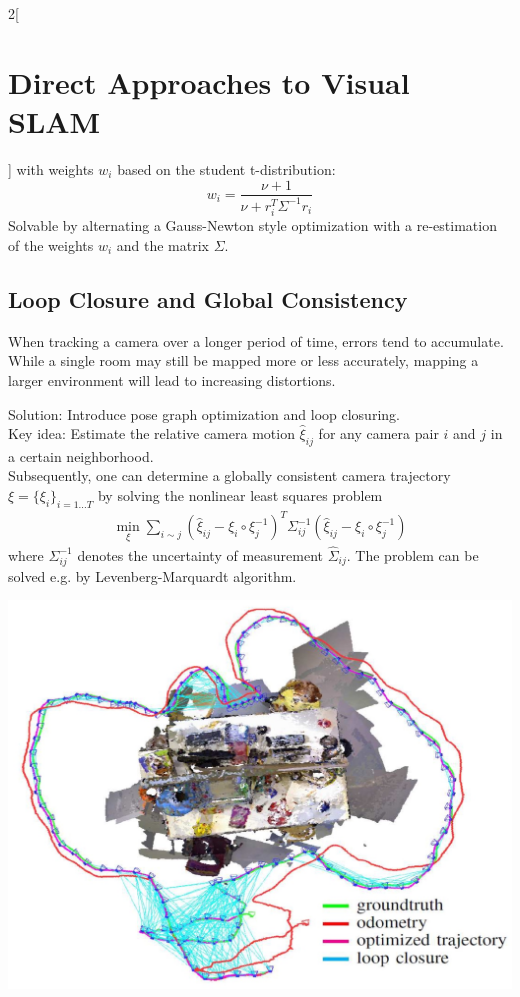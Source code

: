 \documentclass[oneside,fontsize=11pt,paper=a4]{scrartcl}
\newenvironment{myfigure}
  {\par\medskip\noindent\minipage{\linewidth}}
  {\endminipage\par\medskip}
\begin{document}
\begin{multicols}{2}[\section{Direct Approaches to Visual SLAM}]
with weights $w_i$ based on the student t-distribution:
\begin{equation*}
    w_i = \frac{\nu+1}{\nu+r_i^T \Sigma^{-1} r_i}
\end{equation*}
Solvable by alternating a Gauss-Newton style optimization with a re-estimation of the weights $w_i$ and the matrix $\Sigma$.

\subsection{Loop Closure and Global Consistency}
When tracking a camera over a longer period of time, errors tend to accumulate.
While a single room may still be mapped more or less accurately, mapping a larger environment will lead to increasing distortions.\par

Solution: Introduce pose graph optimization and loop closuring.\\
Key idea: Estimate the relative camera motion $\widehat{\xi}_{ij}$ for any camera pair $i$ and $j$ in a certain neighborhood.\\
Subsequently, one can determine a globally consistent camera trajectory $\xi = \{\xi_i\}_{i=1 \ldots T}$ by solving the nonlinear least squares problem
\begin{equation*}
\begin{split}
    \min_{\xi} \sum_{i \sim j} \left(\widehat{\xi}_{ij} - \xi_i \circ \xi_j^{-1} \right)^T \Sigma_{ij}^{-1} \left(\widehat{\xi}_{ij} - \xi_i \circ \xi_j^{-1} \right)
\end{split}
\end{equation*}
where $\Sigma_{ij}^{-1}$ denotes the uncertainty of measurement $\widehat{\Sigma}_{ij}$.
The problem can be solved e.g. by Levenberg-Marquardt algorithm. 

\begin{myfigure}
 \centering
 \includegraphics[width=0.9\linewidth]{Images/Loop_closure.jpg}
\end{myfigure}


\end{multicols}
\end{document}

